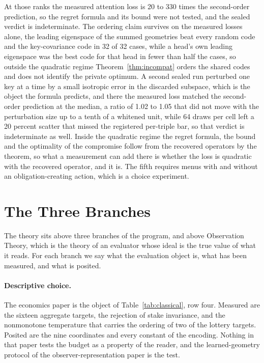 \documentclass[11pt]{article}
\theoremstyle{definition}
\theoremstyle{remark}
\begin{document}
At those ranks the measured attention loss is 20 to 330 times the second-order prediction, so the regret formula and its bound were not tested, and the sealed verdict is indeterminate.
The ordering claim survives on the measured losses alone, the leading eigenspace of the summed geometries beat every random code and the key-covariance code in 32 of 32 cases, while a head's own leading eigenspace was the best code for that head in fewer than half the cases, so outside the quadratic regime Theorem~\ref{thm:incompat} orders the shared codes and does not identify the private optimum.
A second sealed run perturbed one key at a time by a small isotropic error in the discarded subspace, which is the object the formula predicts, and there the measured loss matched the second-order prediction at the median, a ratio of 1.02 to 1.05 that did not move with the perturbation size up to a tenth of a whitened unit, while 64 draws per cell left a 20 percent scatter that missed the registered per-triple bar, so that verdict is indeterminate as well.
Inside the quadratic regime the regret formula, the bound and the optimality of the compromise follow from the recovered operators by the theorem, so what a measurement can add there is whether the loss is quadratic with the recovered operator, and it is.
The fifth requires menus with and without an obligation-creating action, which is a choice experiment.

\section{The Three Branches}
\label{sec:branches}

The theory sits above three branches of the program, and above Observation Theory, which is the theory of an evaluator whose ideal is the true value of what it reads.
For each branch we say what the evaluation object is, what has been measured, and what is posited.

\paragraph{Descriptive choice.}
The economics paper is the object of Table~\ref{tab:classical}, row four.
Measured are the sixteen aggregate targets, the rejection of stake invariance, and the nonmonotone temperature that carries the ordering of two of the lottery targets.
Posited are the nine coordinates and every constant of the encoding.
Nothing in that paper tests the budget as a property of the reader, and the learned-geometry protocol of the observer-representation paper is the test.
\end{document}
